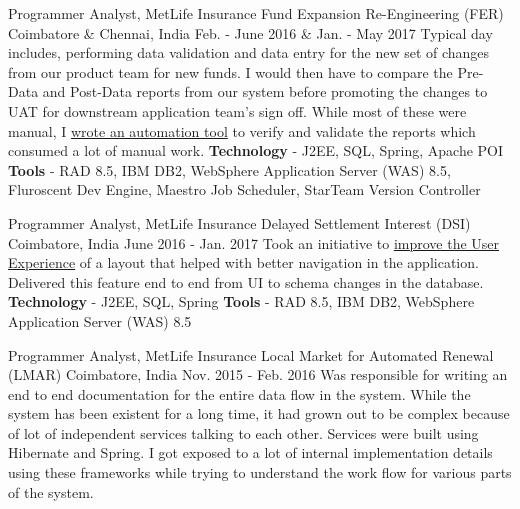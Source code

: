 \begin{cventries}
{  \cventry
    {Programmer Analyst, MetLife Insurance} %
    {Fund Expansion Re-Engineering (FER)} %
    {Coimbatore \& Chennai, India} %
    {Feb. - June 2016 \& Jan. - May 2017} %
    {
        Typical day includes, performing data validation and data entry for the new set of changes from our product team for new funds. I would then have to compare the Pre-Data and Post-Data reports from our system before promoting the changes to UAT for downstream application team's sign off. While most of these were manual, I \underline{wrote an automation tool} to verify and validate the reports which consumed a lot of manual work.
        \newline
        \textbf{Technology} - J2EE, SQL, Spring, Apache POI \newline
        \textbf{Tools} - RAD 8.5, IBM DB2, WebSphere Application Server (WAS) 8.5, Fluroscent Dev Engine, Maestro Job Scheduler, StarTeam Version Controller
    }

  \cventry
    {Programmer Analyst, MetLife Insurance} %
    {Delayed Settlement Interest (DSI)} %
    {Coimbatore, India} %
    {June 2016 - Jan. 2017} %
    {
        Took an initiative to \underline{improve the User Experience} of a layout that helped with better navigation in the application. Delivered this feature end to end from UI to schema changes in the database. 
        \newline
        \textbf{Technology} - J2EE, SQL, Spring \newline
        \textbf{Tools} - RAD 8.5, IBM DB2, WebSphere Application Server (WAS) 8.5
    }

  \cventry
    {Programmer Analyst, MetLife Insurance} %
    {Local Market for Automated Renewal (LMAR)} %
    {Coimbatore, India} %
    {Nov. 2015 - Feb. 2016} %
    {
        Was responsible for writing an end to end documentation for the entire data flow in the system. While the system has been existent for a long time, it had grown out to be complex because of lot of independent services talking to each other. Services were built using Hibernate and Spring. I got exposed to a lot of internal implementation details using these frameworks while trying to understand the work flow for various parts of the system.
    }

}
\end{cventries}
